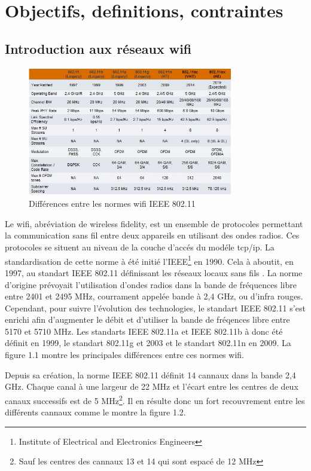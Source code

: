 \chapter{Objectifs, definitions, contraintes}
\section{Introduction aux réseaux wifi}

\begin{figure}
   \centering
   \includegraphics[width=0.8\textwidth,natwidth=488,natheight=513]{images/diffwifi.jpg}
   \caption{Différences entre les normes wifi IEEE 802.11}
\end{figure}
Le wifi, abréviation de wireless fidelity, est un ensemble de protocoles permettant la communication sans fil entre deux
appareils en utilisant des ondes radios. Ces protocoles se situent au niveau de la couche d'accés du modéle tcp/ip.
La standardisation de cette norme à été initié l'IEEE\footnote{Institute of Electrical and Electronics Engineers} en 1990.
Cela à aboutit, en 1997, au standart IEEE 802.11 définissant les réseaux locaux sans fils \cite{WFintro}.
La norme d'origine prévoyait l'utilisation d'ondes radios dans la bande de fréquences libre entre 2401 et 2495 MHz\cite{WFband},
courrament appelée bande à 2,4 GHz, ou d'infra rouges. Cependant, pour suivre l'évolution des technologies, le standart IEEE 
802.11 s'est enrichi afin d'augmenter le débit et d'utiliser la bande de fréqences libre entre 5170 et 5710 MHz.
Les standarts IEEE 802.11a et IEEE 802.11b à donc été définit en 1999, le standart 802.11g et 2003 et le standart 802.11n
en 2009. La figure 1.1 montre les principales différences entre ces normes wifi.\cite{WFevol}

Depuis sa création, la norme IEEE 802.11 définit 14 cannaux dans la bande 2,4 GHz. Chaque canal à une largeur de 22 MHz et 
l'écart entre les centres de deux canaux successifs est de 5 MHz\footnote{Sauf les centres des cannaux 13 et 14 qui sont espacé
de 12 MHz}. Il en résulte donc un fort recouvrement entre les différents cannaux comme le montre la figure 1.2.

